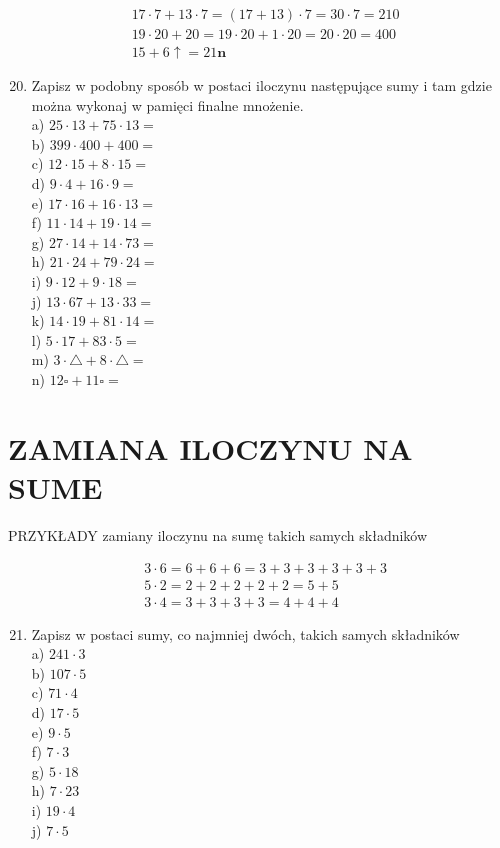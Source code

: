 \documentclass[10pt]{article}
\begin{document}
\[
\begin{aligned}
& 17 \cdot 7+13 \cdot 7=(17+13) \cdot 7=30 \cdot 7=210 \\
& 19 \cdot 20+20=19 \cdot 20+1 \cdot 20=20 \cdot 20=400 \\
& 15+6 \boldsymbol{\uparrow}=21 \boldsymbol{n}
\end{aligned}
\]

\begin{enumerate}
  \setcounter{enumi}{19}
  \item Zapisz w podobny sposób w postaci iloczynu następujące sumy i tam gdzie można wykonaj w pamięci finalne mnożenie.\\
a) \(25 \cdot 13+75 \cdot 13=\)\\
b) \(399 \cdot 400+400=\)\\
c) \(12 \cdot 15+8 \cdot 15=\)\\
d) \(9 \cdot 4+16 \cdot 9=\)\\
e) \(17 \cdot 16+16 \cdot 13=\)\\
f) \(11 \cdot 14+19 \cdot 14=\)\\
g) \(27 \cdot 14+14 \cdot 73=\)\\
h) \(21 \cdot 24+79 \cdot 24=\)\\
i) \(9 \cdot 12+9 \cdot 18=\)\\
j) \(13 \cdot 67+13 \cdot 33=\)\\
k) \(14 \cdot 19+81 \cdot 14=\)\\
l) \(5 \cdot 17+83 \cdot 5=\)\\
m) \(3 \cdot \triangle+8 \cdot \triangle=\)\\
n) \(12 \square+11 \square=\)
\end{enumerate}

\section*{ZAMIANA ILOCZYNU NA SUME}
PRZYKŁADY zamiany iloczynu na sumę takich samych składników

\[
\begin{aligned}
& 3 \cdot 6=6+6+6=3+3+3+3+3+3 \\
& 5 \cdot 2=2+2+2+2+2=5+5 \\
& 3 \cdot 4=3+3+3+3=4+4+4
\end{aligned}
\]

\begin{enumerate}
  \setcounter{enumi}{20}
  \item Zapisz w postaci sumy, co najmniej dwóch, takich samych składników\\
a) \(241 \cdot 3\)\\
b) \(107 \cdot 5\)\\
c) \(71 \cdot 4\)\\
d) \(17 \cdot 5\)\\
e) \(9 \cdot 5\)\\
f) \(7 \cdot 3\)\\
g) \(5 \cdot 18\)\\
h) \(7 \cdot 23\)\\
i) \(19 \cdot 4\)\\
j) \(7 \cdot 5\)
\end{enumerate}
\end{document}
